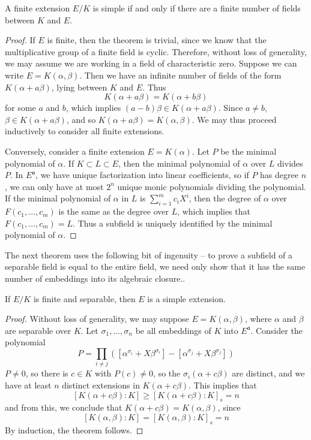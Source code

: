 \begin{theorem}
    A finite extension $E/K$ is simple if and only if there are a finite number of fields between $K$ and $E$.
\end{theorem}
\begin{proof}
    If $E$ is finite, then the theorem is trivial, since we know that the multiplicative group of a finite field is cyclic. Therefore, without loss of generality, we may assume we are working in a field of characteristic zero. Suppose we can write $E = K(\alpha, \beta)$. Then we have an infinite number of fields of the form $K(\alpha + a \beta)$, lying between $K$ and $E$. Thus
    \[ K(\alpha + a \beta) = K(\alpha + b \beta) \]
    for some $a$ and $b$, which implies $(a - b) \beta \in K(\alpha + a \beta)$. Since $a \neq b$, $\beta \in K(\alpha + a \beta)$, and so $K(\alpha + a \beta) = K(\alpha, \beta)$. We may thus proceed inductively to consider all finite extensions.

    Conversely, consider a finite extension $E = K(\alpha)$. Let $P$ be the minimal polynomial of $\alpha$. If $K \subset L \subset E$, then the minimal polynomial of $\alpha$ over $L$ divides $P$. In $E^{\mathfrak{a}}$, we have unique factorization into linear coefficients, so if $P$ has degree $n$, we can only have at most $2^n$ unique monic polynomials dividing the polynomial. If the minimal polynomial of $\alpha$ in $L$ is $\sum_{i = 1}^m c_i X^i$, then the degree of $\alpha$ over $F(c_1, \dots, c_m)$ is the same as the degree over $L$, which implies that $F(c_1, \dots, c_m) = L$. Thus a subfield is uniquely identified by the minimal polynomial of $\alpha$.
\end{proof}

The next theorem uses the following bit of ingenuity -- to prove a subfield of a separable field is equal to the entire field, we need only show that it has the same number of embeddings into its algebraic closure..

\begin{corollary}
    If $E/K$ is finite and separable, then $E$ is a simple extension.
\end{corollary}
\begin{proof}
    Without loss of generality, we may suppose $E = K(\alpha, \beta)$, where $\alpha$ and $\beta$ are separable over $K$. Let $\sigma_1, \dots, \sigma_n$ be all embeddings of $K$ into $E^{\mathfrak{a}}$. Consider the polynomial
    \[ P = \prod_{i \neq j} ([\alpha^{\sigma_i} + X \beta^{\sigma_i}] - [\alpha^{\sigma_j} + X \beta^{\sigma_j}]) \]
    $P \neq 0$, so there is $c \in K$ with $P(c) \neq 0$, so the $\sigma_i(\alpha + c \beta)$ are distinct, and we have at least     $n$ distinct extensions in $K(\alpha + c \beta)$. This implies that
    \[ [K(\alpha + c \beta): K] \geq [K(\alpha + c \beta): K]_s = n \]
    and from this, we conclude that $K(\alpha + c \beta) = K(\alpha, \beta)$, since
    \[ [K(\alpha, \beta) : K] = [K(\alpha, \beta): K]_s = n \]
    By induction, the theorem follows.
\end{proof}

